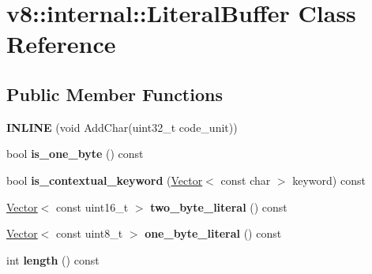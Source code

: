 \hypertarget{classv8_1_1internal_1_1_literal_buffer}{}\section{v8\+:\+:internal\+:\+:Literal\+Buffer Class Reference}
\label{classv8_1_1internal_1_1_literal_buffer}
\subsection*{Public Member Functions}
\begin{DoxyCompactItemize}
\item 
\hypertarget{classv8_1_1internal_1_1_literal_buffer_a2f757f671c72173fc62395254e4eb71c}{}{\bfseries I\+N\+L\+I\+N\+E} (void Add\+Char(uint32\+\_\+t code\+\_\+unit))\label{classv8_1_1internal_1_1_literal_buffer_a2f757f671c72173fc62395254e4eb71c}

\item 
\hypertarget{classv8_1_1internal_1_1_literal_buffer_a762672132b89b8d81d19543ad5c4f9a6}{}bool {\bfseries is\+\_\+one\+\_\+byte} () const \label{classv8_1_1internal_1_1_literal_buffer_a762672132b89b8d81d19543ad5c4f9a6}

\item 
\hypertarget{classv8_1_1internal_1_1_literal_buffer_ad9b6e77a0db54a0d24366257423d1ec7}{}bool {\bfseries is\+\_\+contextual\+\_\+keyword} (\hyperlink{classv8_1_1internal_1_1_vector}{Vector}$<$ const char $>$ keyword) const \label{classv8_1_1internal_1_1_literal_buffer_ad9b6e77a0db54a0d24366257423d1ec7}

\item 
\hypertarget{classv8_1_1internal_1_1_literal_buffer_ace6fbfaafde62a75b345ac453a9e8e68}{}\hyperlink{classv8_1_1internal_1_1_vector}{Vector}$<$ const uint16\+\_\+t $>$ {\bfseries two\+\_\+byte\+\_\+literal} () const \label{classv8_1_1internal_1_1_literal_buffer_ace6fbfaafde62a75b345ac453a9e8e68}

\item 
\hypertarget{classv8_1_1internal_1_1_literal_buffer_a00ed1e85c165b3775d7815c525e509cf}{}\hyperlink{classv8_1_1internal_1_1_vector}{Vector}$<$ const uint8\+\_\+t $>$ {\bfseries one\+\_\+byte\+\_\+literal} () const \label{classv8_1_1internal_1_1_literal_buffer_a00ed1e85c165b3775d7815c525e509cf}

\item 
\hypertarget{classv8_1_1internal_1_1_literal_buffer_a8b12d1e4e4476b70f1cf84ddb150c02c}{}int {\bfseries length} () const \label{classv8_1_1internal_1_1_literal_buffer_a8b12d1e4e4476b70f1cf84ddb150c02c}


\end{DoxyCompactItemize}
